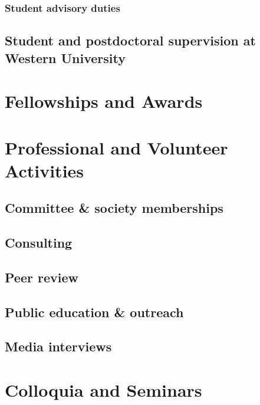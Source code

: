 \documentclass[12pt]{article}
\begin{document}
\subsubsection{Student advisory duties}


\subsection{Student and postdoctoral supervision at Western University}


\section{Fellowships and Awards}


\section{Professional and Volunteer Activities}

\subsection{Committee \& society memberships}


\subsection{Consulting}


\subsection{Peer review}


\subsection{Public education \& outreach}


\subsection{Media interviews}


\section{Colloquia and Seminars}


\clearpage

\begin{publications}

\printbibliography[title={Submitted refereed publications},keyword=submit]

\printbibliography[title={Refereed publications},keyword=ref]

\setcounter{papers}{0}
\printbibliography[title={Conference presentations},keyword=unref]


\end{publications}
\end{document}
